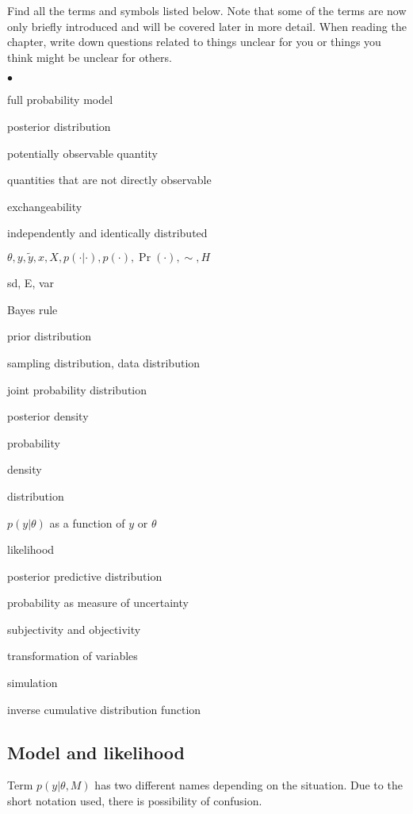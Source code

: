 \documentclass[a4paper,11pt,english]{article}
\begin{document}
Find all the terms and symbols listed below. Note that some of the
terms are now only briefly introduced and will be covered later in
more detail.
When reading the chapter, write down questions related to things
unclear for you or things you think might be unclear for others.
\begin{list}{$\bullet$}{\parsep=0pt\itemsep=2pt}
\item full probability model
\item posterior distribution
\item potentially observable quantity
\item quantities that are not directly observable
\item exchangeability
\item independently and identically distributed
\item $\theta, y, \tilde{y}, x, X, p(\cdot|\cdot), p(\cdot), \Pr(\cdot), \sim, H$
\item sd, E, var
\item Bayes rule
\item prior distribution
\item sampling distribution, data distribution
\item joint probability distribution
\item posterior density
\item probability
\item density
\item distribution
\item $p(y|\theta)$ as a function of $y$ or $\theta$
\item likelihood
\item posterior predictive distribution
\item probability as measure of uncertainty
\item subjectivity and objectivity
\item transformation of variables
\item simulation
\item inverse cumulative distribution function
\end{list}

\subsection*{Model and likelihood}

Term $p(y|\theta,M)$ has two different names depending on the
situation. Due to the short notation used, there is possibility of
confusion.
\end{document}
